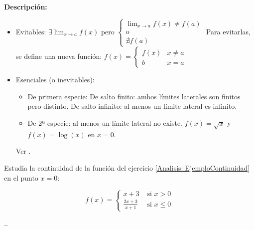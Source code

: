 \textbf{Descripción: }
\begin{itemize}
	\item Evitables: $\exists \displaystyle\lim_{x\to a}f(x)$ pero $\begin{cases}\displaystyle\lim_{x\to a}f(x) \neq f(a)\\\text{o}\\\nexists f(a)\end{cases}$
	\subitem Para evitarlas, se define una nueva función: $f(x) = \begin{cases}f(x) & x\neq a\\ b & x=a \end{cases}$
	\item Esenciales (o inevitables): 
	\begin{itemize}
		\item De primera especie:
		\subitem De salto finito: ambos límites laterales son finitos pero distinto.
		\subitem De salto infinito: al menos un límite lateral es infinito.
		\item De 2ª especie: al menos un límite lateral no existe. $f(x) = \sqrt{x}$ y $f(x) = \log(x)$ en $x=0$.
	\end{itemize}
\obs Ver .
\end{itemize}

\begin{problem} Estudia la continuidad de la función del ejercicio \ref{Analisis::EjemploContinuidad} en el punto $x=0$:

$$f(x) = 
		\begin{cases}
		x+3 & \text{ si } x>0\\
		\frac{2x+3}{x+1}& \text{ si } x\leq 0 
		\end{cases}
	$$
\solution

.\vspace{5cm}.
\end{problem}

